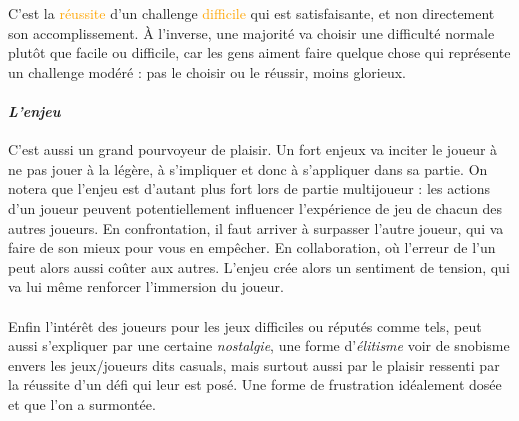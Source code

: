 C'est la \textcolor{orange}{réussite} d'un challenge \textcolor{orange}{difficile} qui est satisfaisante, et non directement son accomplissement. À l'inverse, une majorité va choisir une difficulté normale plutôt que facile ou difficile, car les gens aiment \textcolor{vert}{faire} quelque chose qui représente un \textcolor{vert}{challenge modéré} : pas le choisir ou le réussir, moins glorieux.

			\paragraph{\emph{L’enjeu} \\ \quad}
C’est aussi un grand pourvoyeur de plaisir. Un fort enjeux va inciter le joueur à ne pas jouer à la légère, à s’impliquer et donc à s’appliquer dans sa partie. On notera que l’enjeu est d’autant plus fort lors de partie multijoueur : les actions d’un joueur peuvent potentiellement influencer l’expérience de jeu de chacun des autres joueurs. En confrontation, il faut arriver à surpasser l’autre joueur, qui va faire de son mieux pour vous en empêcher. En collaboration, où l’erreur de l’un peut alors aussi coûter aux autres. L’enjeu crée alors un sentiment de tension, qui va lui même renforcer l’immersion du joueur.

\paragraph{}Enfin l’intérêt des joueurs pour les jeux difficiles ou réputés comme tels, peut aussi s’expliquer par une certaine \emph{nostalgie}, une forme d’\emph{élitisme} voir de snobisme envers les jeux/joueurs dits casuals, mais surtout aussi par le plaisir ressenti par la réussite d’un défi qui leur est posé. Une forme de frustration idéalement dosée et que l’on a surmontée.

